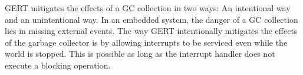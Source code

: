 GERT mitigates the effects of a GC collection in two ways: An intentional
way and an unintentional way. In an embedded system, the danger of a
GC collection lies in missing external events. The way GERT intentionally mitigates
the effects of the garbage collector is by allowing interrupts to be serviced
even while the world is stopped. This is possible as long as the interrupt
handler does not execute a blocking operation.



